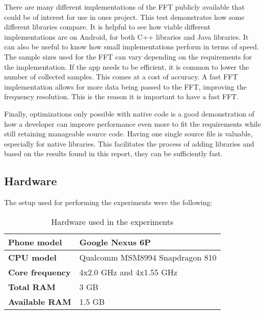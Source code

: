 
There are many different implementations of the FFT publicly available that could be of interest for use in ones project. This test demonstrates how some different libraries compare. It is helpful to see how viable different implementations are on Android, for both C++ libraries and Java libraries. It can also be useful to know how small implementations perform in terms of speed. The sample sizes used for the FFT can vary depending on the requirements for the implementation. If the app needs to be efficient, it is common to lower the number of collected samples. This comes at a cost of accuracy. A fast FFT implementation allows for more data being passed to the FFT, improving the frequency resolution. This is the reason it is important to have a fast FFT.


Finally, optimizations only possible with native code is a good demonstration of how a developer can improve performance even more to fit the requirements while still retaining manageable source code. Having one single source file is valuable, especially for native libraries. This facilitates the process of adding libraries and based on the results found in this report, they can be sufficiently fast.

\subsection{Hardware}
The setup used for performing the experiments were the following:

\begin{table}[H]
    \centering
    \label{tab:hardware}
    \caption{Hardware used in the experiments}
    \begin{tabular}{|l|l|}
        \hline
        \textbf{Phone model} & Google Nexus 6P\\
        \hline
        \textbf{CPU model} & Qualcomm MSM8994 Snapdragon 810\\
        \hline
        \textbf{Core frequency} & 4x2.0 GHz and 4x1.55 GHz\\
        \hline
        \textbf{Total RAM} & 3 GB\\
        \hline
        \textbf{Available RAM} & 1.5 GB\\
        \hline
    \end{tabular}
\end{table}


